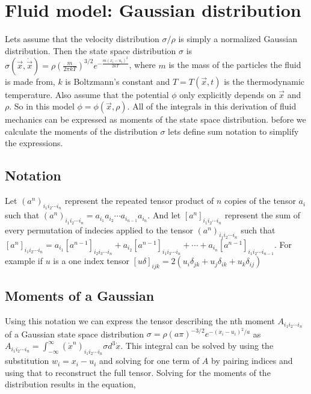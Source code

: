 \documentclass[%
preprint,
 amsmath,amssymb,
 aps,
]{revtex4-1}
\newcommand{\dvec}[1]{\dot{\vec{#1}}}
\newcommand{\intVdot}[1]{\int_{-\infty}^{\infty} #1 d^3\dot{x}}
\begin{document}
\section{Fluid model: Gaussian distribution}
Lets assume that the velocity distribution $\sigma/\rho$ is simply a normalized Gaussian distribution. Then the state space distribution $\sigma$ is $\sigma(\vec{x}, \dvec{x}) = \rho\left(\frac{m}{2\pi kT}\right)^{3/2}e^{-\frac{m\left(x_i - u_i\right)^2}{2kT}}$, where $m$ is the mass of the particles the fluid is made from, $k$ is Boltzmann's constant and $T=T(\vec{x}, t)$ is the thermodynamic temperature. Also assume that the potential $\phi$ only explicitly depends on $\vec{x}$ and $\rho$. So in this model $\phi=\phi(\vec{x}, \rho)$. All of the integrals in this derivation of fluid mechanics can be expressed as moments of the state space distribution. before we calculate the moments of the distribution $\sigma$ lets define sum notation to simplify the expressions.

\subsection{Notation}
Let $\left(a^n\right)_{i_1i_2\cdots i_n}$ represent the repeated tensor product of $n$ copies of the tensor $a_i$ such that $\left(a^n\right)_{i_1i_2\cdots i_n}=a_{i_1}a_{i_2}\cdots a_{i_{n-1}}a_{i_n}$. And let $\left[a^n\right]_{i_1i_2\cdots i_n}$ represent the sum of every permutation of indecies applied to the tensor $\left(a^n\right)_{i_1i_2\cdots i_n}$ such that $\left[a^n\right]_{i_1i_2\cdots i_n}=a_{i_1}\left[a^{n-1}\right]_{i_2i_3\cdots i_n} + a_{i_2}\left[a^{n-1}\right]_{i_1i_3\cdots i_n} + \cdots + a_{i_n}\left[a^{n-1}\right]_{i_1i_2\cdots i_{n-1}}$. For example if $u$ is a one index tensor $\left[u\delta\right]_{ijk}=2\left(u_i\delta_{jk} + u_j\delta_{ik} + u_k\delta_{ij}\right)$

\subsection{Moments of a Gaussian}
Using this notation we can express the tensor describing the nth moment $A_{i_1i_2\cdots i_n}$ of a Gaussian state space distribution $\sigma=\rho\left(a \pi\right)^{-3/2}e^{-\left(\dot{x}_i-u_i\right)^2/a}$ as $A_{i_1i_2\cdots i_n}=\intVdot{\left(\dot{x}^n\right)_{i_1i_2\cdots i_n}\sigma}$. This integral can be solved by using the substitution $w_i=x_i - u_i$ and solving for one term of $A$ by pairing indices and using that to reconstruct the full tensor. Solving for the moments of the distribution results in the equation,
\end{document}
